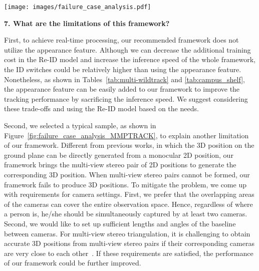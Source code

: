 \documentclass{CVM}
\begin{document}
\begin{figure*}[!h]
  \centering
  \texttt{[image: images/failure\_case\_analysis.pdf]}
  \caption{\textbf{Failure case analysis on \textit{MMPTRACK} dataset}~\cite{han2021mmptrack}. Our method cannot handle two corner cases. (1) When only one camera captures the target, the corresponding 3D position cannot be calculated since multi-view stereo pair is unavailable. To solve this issue, we should add more cameras to observe those areas. (2) When two cameras are very close to each other, the triangulation bias will be significantly increased. To ameliorate this issue, we can relocate the cameras to increase the length and angle of the baseline.}\label{fig:failure_case_analysis_MMPTRACK}
\end{figure*}

\textbf{7. What are the limitations of this framework?} 

First, to achieve real-time processing, our recommended framework does not utilize the appearance feature. Although we can decrease the additional training cost in the Re-ID model and increase the inference speed of the whole framework, the ID switches could be relatively higher than using the appearance feature. Nonetheless, as shown in Tables~\ref{tab:multi-wildtrack} and \ref{tab:campus_shelf}, the appearance feature can be easily added to our framework to improve the tracking performance by sacrificing the inference speed. We suggest considering these trade-offs and using the Re-ID model based on the needs.



Second, we selected a typical sample, as shown in Figure~\ref{fig:failure_case_analysis_MMPTRACK}, to explain another limitation of our framework. Different from previous works\cite{sternig2011multi,wen2017multi,he2020multi}, in which the 3D position on the ground plane can be directly generated from a monocular 2D position, our framework brings the multi-view stereo pair of 2D positions to generate the corresponding 3D position. When multi-view stereo pairs cannot be formed, our framework fails to produce 3D positions. To mitigate the problem, we come up with requirements for camera settings. First, we prefer that the overlapping areas of the cameras can cover the entire observation space. Hence, regardless of where a person is, he/she should be simultaneously captured by at least two cameras. Second, we would like to set up sufficient lengths and angles of the baseline between cameras. For multi-view stereo triangulation, it is challenging to obtain accurate 3D positions from multi-view stereo pairs if their corresponding cameras are very close to each other~\cite{hartley2003multiple}. If these requirements are satisfied, the performance of our framework could be further improved.
\end{document}
